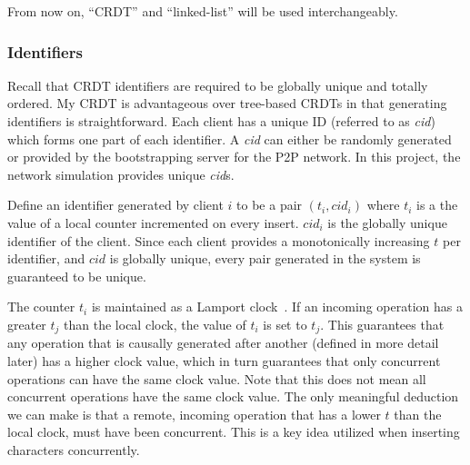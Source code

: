 \documentclass[12pt,a4paper,twoside,openright]{report}
\begin{document}
		
		From now on, ``CRDT'' and ``linked-list'' will be used interchangeably.
	
		\subsubsection{Identifiers}
		
		Recall that CRDT identifiers are required to be globally unique and totally ordered. My CRDT is advantageous over tree-based CRDTs in that generating identifiers is straightforward. Each client has a unique ID (referred to as \textit{cid}) which forms one part of each identifier. A \textit{cid} can either be randomly generated or provided by the bootstrapping server for the P2P network. In this project, the network simulation provides unique \textit{cid}s.
		
		Define an identifier generated by client $i$ to be a pair $(t_i, cid_i)$ where $t_i$ is a the value of a local counter incremented on every insert. $cid_i$ is the globally unique identifier of the client. Since each client provides a monotonically increasing $t$ per identifier, and $cid$ is globally unique, every pair generated in the system is guaranteed to be unique.
		
		The counter $t_i$ is maintained as a Lamport clock~\cite{lamport1978}. If an incoming operation has a greater $t_j$ than the local clock, the value of $t_i$ is set to $t_j$. This guarantees that any operation that is causally generated after another (defined in more detail later) has a higher clock value, which in turn guarantees that only concurrent operations can have the same clock value. Note that this does not mean all concurrent operations have the same clock value. The only meaningful deduction we can make is that a remote, incoming operation that has a lower $t$ than the local clock, must have been concurrent. This is a key idea utilized when inserting characters concurrently.
		
\end{document}
